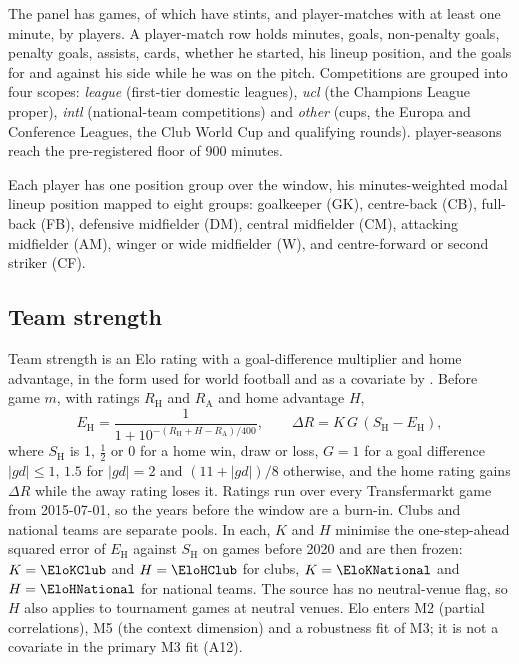 \documentclass[11pt,a4paper]{article}
\begin{document}
The panel has \NGames{} games, of which \NGamesWithStints{} have stints, and
\NPlayerMatches{} player-matches with at least one minute, by \NPlayersPanel{}
players. A player-match row holds minutes, goals, non-penalty goals, penalty
goals, assists, cards, whether he started, his lineup position, and the goals
for and against his side while he was on the pitch. Competitions are grouped
into four scopes: \emph{league} (first-tier domestic leagues), \emph{ucl}
(the Champions League proper), \emph{intl} (national-team competitions) and
\emph{other} (cups, the Europa and Conference Leagues, the Club World Cup and
qualifying rounds). \NPlayerSeasonsQualifying{} player-seasons reach the
pre-registered floor of 900 minutes.

Each player has one position group over the window, his minutes-weighted modal
lineup position mapped to eight groups: goalkeeper (GK), centre-back (CB),
full-back (FB), defensive midfielder (DM), central midfielder (CM), attacking
midfielder (AM), winger or wide midfielder (W), and centre-forward or second
striker (CF).

\subsection{Team strength}
\label{sec:elo}

Team strength is an Elo rating \citep{elo1978rating} with a goal-difference
multiplier and home advantage, in the form used for world football and as a
covariate by \citet{hvattum2010elo}. Before game $m$, with ratings $R_{\mathrm H}$
and $R_{\mathrm A}$ and home advantage $H$,
\begin{equation}
  E_{\mathrm H} = \frac{1}{1 + 10^{-(R_{\mathrm H} + H - R_{\mathrm A})/400}},
  \qquad
  \Delta R = K\, G\, (S_{\mathrm H} - E_{\mathrm H}),
  \label{eq:elo}
\end{equation}
where $S_{\mathrm H}$ is 1, $\tfrac12$ or 0 for a home win, draw or loss,
$G = 1$ for a goal difference $|\mathit{gd}| \le 1$, $1.5$ for $|\mathit{gd}| = 2$
and $(11 + |\mathit{gd}|)/8$ otherwise, and the home rating gains $\Delta R$
while the away rating loses it. Ratings run over every Transfermarkt game from
2015-07-01, so the years before the window are a burn-in. Clubs and national
teams are separate pools. In each, $K$ and $H$ minimise the one-step-ahead squared error of
$E_{\mathrm H}$ against $S_{\mathrm H}$ on games before 2020 and are then
frozen: $K = \EloKClub$ and $H = \EloHClub$ for clubs, $K = \EloKNational$ and
$H = \EloHNational$ for national teams. The source has no neutral-venue flag,
so $H$ also applies to tournament games at neutral venues. Elo enters M2
(partial correlations), M5 (the context dimension) and a robustness fit of M3;
it is not a covariate in the primary M3 fit (A12).
\end{document}
